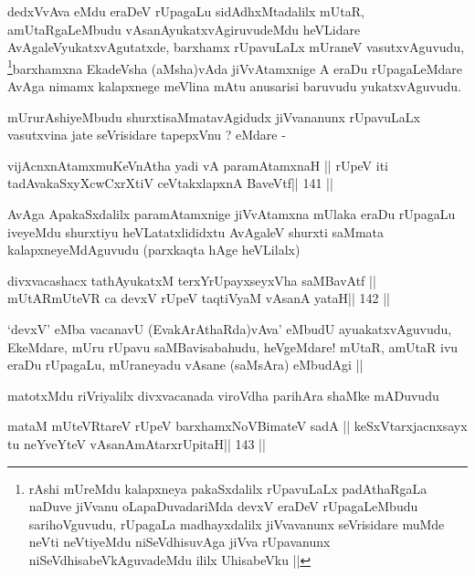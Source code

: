 \begin{artha}
dedxVvAva eMdu eraDeV rUpagaLu sidAdhxMtadalilx mUtaR, amUtaRgaLeMbudu
vAsanAyukatxvAgiruvudeMdu heVLidare AvAgaleVyukatxvAgutatxde, barxhamx
rUpavuLaLx mUraneV vasutxvAguvudu, \footnote[1]{rAshi mUreMdu
  kalapxneya pakaSxdalilx rUpavuLaLx padAthaRgaLa naDuve jiVvanu
  oLapaDuvadariMda devxV eraDeV rUpagaLeMbudu sarihoVguvudu, rUpagaLa
  madhayxdalilx jiVvavanunx seVrisidare muMde neVti neVtiyeMdu
  niSeVdhisuvAga jiVva rUpavanunx niSeVdhisabeVkAguvadeMdu ililx
  UhisabeVku ||}barxhamxna EkadeVsha
(aMsha)vAda jiVvAtamxnige A eraDu rUpagaLeMdare AvAga nimamx
kalapxnege meVlina mAtu anusarisi baruvudu yukatxvAguvudu.
\end{artha}

\begin{artha}
mUrurAshiyeMbudu shurxtisaMmatavAgidudx jiVvananunx rUpavuLaLx
vasutxvina jate seVrisidare tapepxVnu ? eMdare -
\end{artha}

\begin{shl}
vijAcnxnAtamxmuKeVnAtha yadi vA paramAtamxnaH ||
rUpeV iti tadA\s vakaSxyXcwCxrXtiV ceVtakxlapxnA BaveVtf\hfill || 141 ||
\end{shl}

\begin{artha}
AvAga ApakaSxdalilx paramAtamxnige jiVvAtamxna mUlaka eraDu rUpagaLu
iveyeMdu shurxtiyu heVLatatxlididxtu AvAgaleV shurxti saMmata
kalapxneyeMdAguvudu (parxkaqta hAge heVLilalx)
\end{artha}

\begin{shl}
divxvacashacx tathA\s yukatxM terxYrUpayxseyxVha saMBavAtf ||
mUtARmUteVR ca devxV rUpeV taqtiVyaM vAsanA yataH\hfill || 142 ||
\end{shl}

\begin{artha}
`devxV' eMba vacanavU (EvakArAthaRda)vAva' eMbudU ayuakatxvAguvudu,
  EkeMdare, mUru rUpavu saMBavisabahudu, heVgeMdare! mUtaR, amUtaR ivu
  eraDu rUpagaLu, mUraneyadu vAsane (saMsAra) eMbudAgi ||

matotxMdu riVriyalilx divxvacanada viroVdha parihAra shaMke mADuvudu
\end{artha}

\begin{shl}
mataM mUteVRtareV rUpeV barxhamxNoV\s BimateV sadA ||
keSxVtarxjacnxsayx tu neYveYteV vAsanAmAtarxrUpitaH\hfill || 143 ||
\end{shl}

